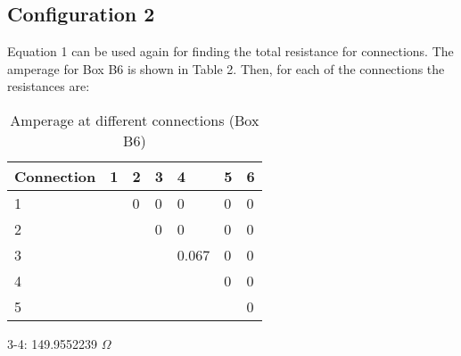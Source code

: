 \documentclass [12pt, letterpaper, twoside] {article}
\begin{document}
\subsection* {Configuration 2}
Equation 1 can be used again for finding the total resistance for connections. The amperage for Box B6 is shown in Table 2. Then, for each of the connections the resistances are:

\begin {table}
  \centering
  \begin {tabular}{| l | l | l | l | l | l | l |}
    \hline\hline
    Connection & 1 & 2 & 3 & 4 & 5 & 6 \\
    \hline
    1 & & 0 & 0 & 0 & 0 & 0 \\
    \hline
    2 & & & 0 & 0 & 0 & 0 \\
    \hline
    3 & & & & 0.067 & 0 & 0 \\
    \hline
    4 & & & & & 0 & 0 \\
    \hline
    5 & & & & & & 0 \\
    \hline\hline
  \end {tabular}
  \caption {Amperage at different connections (Box B6)}
\end {table}

\vspace{0.5cm}
3-4: 149.9552239 \(\Omega\)
\vspace{0.5cm}
\end{document}

